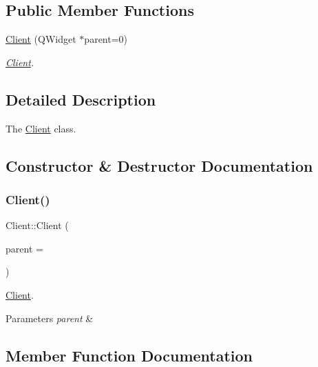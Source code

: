 \subsection*{Public Member Functions}
\begin{DoxyCompactItemize}
\item 
\hyperlink{class_client_ab9cb979d7fb7dd0bd3bf645279a6ffb5}{Client} (Q\+Widget $\ast$parent=0)
\begin{DoxyCompactList}\small\item\em \hyperlink{class_client}{Client}. \end{DoxyCompactList}\end{DoxyCompactItemize}


\subsection{Detailed Description}
The \hyperlink{class_client}{Client} class. 

\subsection{Constructor \& Destructor Documentation}
\hypertarget{class_client_ab9cb979d7fb7dd0bd3bf645279a6ffb5}{}\label{class_client_ab9cb979d7fb7dd0bd3bf645279a6ffb5} 
\subsubsection{\texorpdfstring{Client()}{Client()}}
{\footnotesize\ttfamily Client\+::\+Client (\begin{DoxyParamCaption}\item[{Q\+Widget $\ast$}]{parent = {} }\end{DoxyParamCaption})\hspace{0.3cm}{\ttfamily [explicit]}}



\hyperlink{class_client}{Client}. 


\begin{DoxyParams}{Parameters}
{\em parent} & \\
\hline
\end{DoxyParams}


\subsection{Member Function Documentation}
\hypertarget{class_client_a91bf1f59731649499365d8b18e6aee62}{}\label{class_client_a91bf1f59731649499365d8b18e6aee62} 
